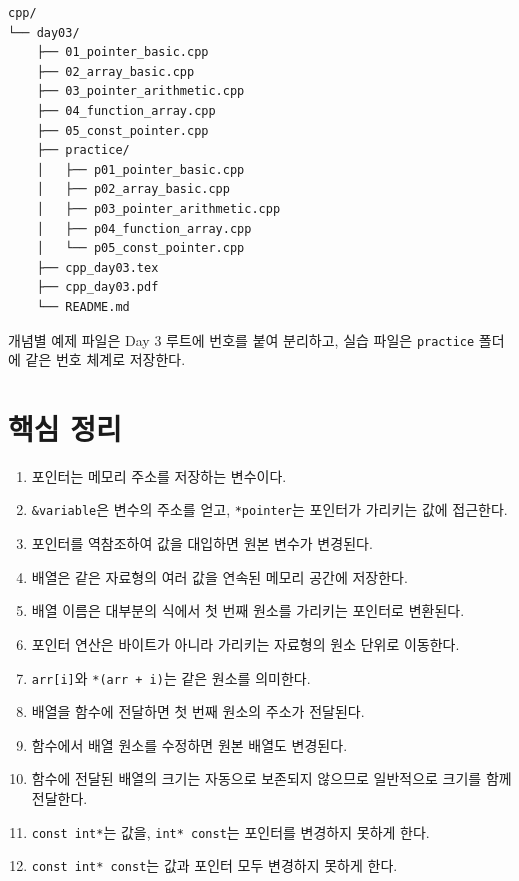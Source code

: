 \documentclass[11pt,a4paper]{article}
\begin{document}
\begin{verbatim}
cpp/
└── day03/
    ├── 01_pointer_basic.cpp
    ├── 02_array_basic.cpp
    ├── 03_pointer_arithmetic.cpp
    ├── 04_function_array.cpp
    ├── 05_const_pointer.cpp
    ├── practice/
    │   ├── p01_pointer_basic.cpp
    │   ├── p02_array_basic.cpp
    │   ├── p03_pointer_arithmetic.cpp
    │   ├── p04_function_array.cpp
    │   └── p05_const_pointer.cpp
    ├── cpp_day03.tex
    ├── cpp_day03.pdf
    └── README.md
\end{verbatim}

개념별 예제 파일은 Day 3 루트에 번호를 붙여 분리하고, 실습 파일은 \texttt{practice} 폴더에 같은 번호 체계로 저장한다.

\section{핵심 정리}

\begin{enumerate}[leftmargin=1.5em]
    \item 포인터는 메모리 주소를 저장하는 변수이다.
    \item \texttt{\&variable}은 변수의 주소를 얻고, \texttt{*pointer}는 포인터가 가리키는 값에 접근한다.
    \item 포인터를 역참조하여 값을 대입하면 원본 변수가 변경된다.
    \item 배열은 같은 자료형의 여러 값을 연속된 메모리 공간에 저장한다.
    \item 배열 이름은 대부분의 식에서 첫 번째 원소를 가리키는 포인터로 변환된다.
    \item 포인터 연산은 바이트가 아니라 가리키는 자료형의 원소 단위로 이동한다.
    \item \texttt{arr[i]}와 \texttt{*(arr + i)}는 같은 원소를 의미한다.
    \item 배열을 함수에 전달하면 첫 번째 원소의 주소가 전달된다.
    \item 함수에서 배열 원소를 수정하면 원본 배열도 변경된다.
    \item 함수에 전달된 배열의 크기는 자동으로 보존되지 않으므로 일반적으로 크기를 함께 전달한다.
    \item \texttt{const int*}는 값을, \texttt{int* const}는 포인터를 변경하지 못하게 한다.
    \item \texttt{const int* const}는 값과 포인터 모두 변경하지 못하게 한다.
\end{enumerate}
\end{document}
